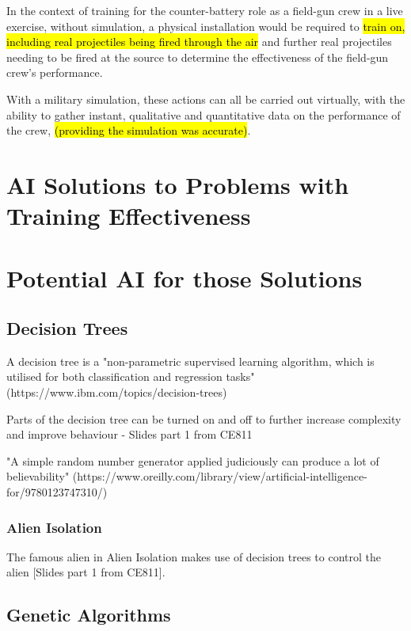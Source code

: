 \documentclass{article}
\begin{document}
In the context of training for the counter-battery role as a field-gun crew in a live exercise, without simulation, a physical installation would be required to \hl{train on, including real projectiles being fired through the air} and further real projectiles needing to be fired at the source to determine the effectiveness of the field-gun crew's performance.

With a military simulation, these actions can all be carried out virtually, with the ability to gather instant, qualitative and quantitative data on the performance of the crew, \hl{(providing the simulation was accurate)}.

\section{AI Solutions to Problems with Training Effectiveness}

\section{Potential AI for those Solutions}

\subsection{Decision Trees}

A decision tree is a "non-parametric supervised learning algorithm, which is utilised for both classification and regression tasks" (https://www.ibm.com/topics/decision-trees)

Parts of the decision tree can be turned on and off to further increase complexity and improve behaviour - Slides part 1 from CE811

"A simple random number generator applied judiciously can produce a lot of believability"  (https://www.oreilly.com/library/view/artificial-intelligence-for/9780123747310/)

\subsubsection{Alien Isolation}

The famous alien in Alien Isolation makes use of decision trees to control the alien [Slides part 1 from CE811]. 

\subsection{Genetic Algorithms}
\end{document}
